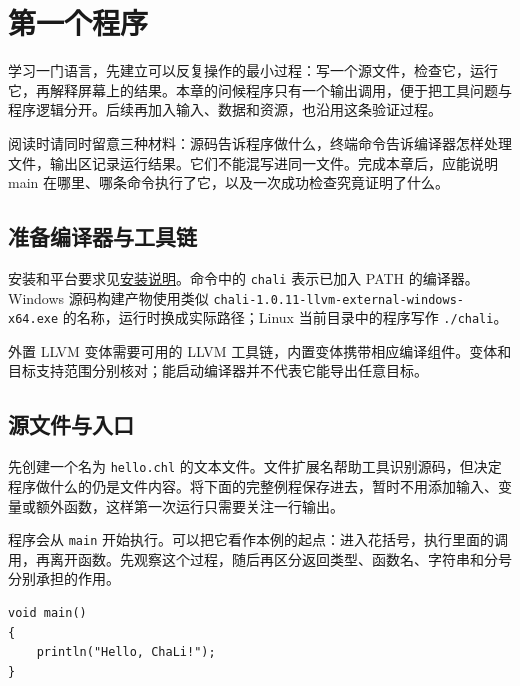 \chapter{第一个程序}
\label{ch:01}

学习一门语言，先建立可以反复操作的最小过程：写一个源文件，检查它，运行它，再解释屏幕上的结果。本章的问候程序只有一个输出调用，便于把工具问题与程序逻辑分开。后续再加入输入、数据和资源，也沿用这条验证过程。

阅读时请同时留意三种材料：源码告诉程序做什么，终端命令告诉编译器怎样处理文件，输出区记录运行结果。它们不能混写进同一文件。完成本章后，应能说明 main 在哪里、哪条命令执行了它，以及一次成功检查究竟证明了什么。

\section{准备编译器与工具链}

安装和平台要求见\href{https://github.com/rabbitc999/ChaLi/blob/master/doc/39-installation-packages.md}{安装说明}。命令中的 \texttt{chali} 表示已加入 PATH 的编译器。Windows 源码构建产物使用类似 \texttt{chali-\allowbreak{}1.\allowbreak{}0.\allowbreak{}11-\allowbreak{}llvm-\allowbreak{}external-\allowbreak{}windows-\allowbreak{}x64.\allowbreak{}exe} 的名称，运行时换成实际路径；Linux 当前目录中的程序写作 \texttt{.\allowbreak{}/\allowbreak{}chali}。

外置 LLVM 变体需要可用的 LLVM 工具链，内置变体携带相应编译组件。变体和目标支持范围分别核对；能启动编译器并不代表它能导出任意目标。

\section{源文件与入口}

先创建一个名为 \texttt{hello.\allowbreak{}chl} 的文本文件。文件扩展名帮助工具识别源码，但决定程序做什么的仍是文件内容。将下面的完整例程保存进去，暂时不用添加输入、变量或额外函数，这样第一次运行只需要关注一行输出。

程序会从 \texttt{main} 开始执行。可以把它看作本例的起点：进入花括号，执行里面的调用，再离开函数。先观察这个过程，随后再区分返回类型、函数名、字符串和分号分别承担的作用。

\par
\medskip
\begin{lstlisting}[style=chali]
void main()
{
    println("Hello, ChaLi!");
}
\end{lstlisting}
\par
\medskip

